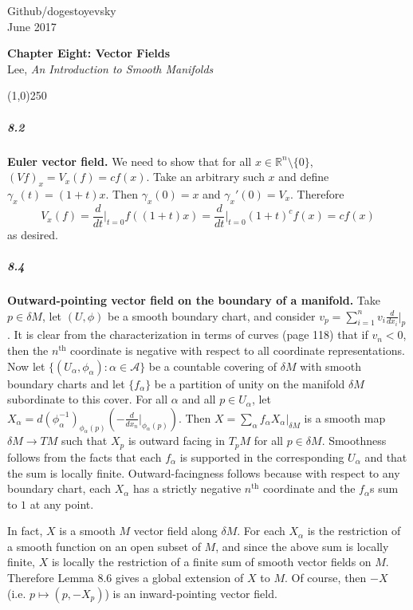 \documentclass[10pt,letter]{article}
\begin{document}
\noindent Github/dogestoyevsky \\
June 2017
\begin{center}
\textbf{Chapter Eight: Vector Fields}\\ Lee, \textit{An Introduction to Smooth Manifolds}

\line(1,0){250}
\end{center}

\subparagraph{8.2} {\bf Euler vector field.}  We need to show that for all $x \in \mathbb{R}^n \setminus \lbrace 0 \rbrace$, $(Vf)_x = V_x(f) = cf(x)$. Take an arbitrary such $x$ and define $\gamma_x(t) = (1+t)x$. Then $\gamma_x(0) = x$ and $\gamma_x'(0) = V_x$. Therefore
\[ V_x(f) = \frac{d}{dt} \bigg\vert_{t = 0} f((1+t)x) = \frac{d}{dt} \bigg\vert_{t = 0} (1+t)^c f(x) = cf(x)
\]
as desired. 

\subparagraph{8.4} {\bf Outward-pointing vector field on the boundary of a manifold.} Take $p \in \delta M$, let $(U,\phi)$ be a smooth boundary chart, and consider $v_p = \sum_{i=1}^n v_i \frac{d}{dx_i}\vert_p$. It is clear from the characterization in terms of curves (page 118) that if $v_n < 0$, then the $n^{\text{th}}$ coordinate is negative with respect to all coordinate representations. Now let $\lbrace (U_{\alpha},\phi_{\alpha}): \alpha \in \mathcal{A} \rbrace$ be a countable covering of $\delta M$ with smooth boundary charts and let $\lbrace f_{\alpha} \rbrace$ be a partition of unity on the manifold $\delta M$ subordinate to this cover. For all $\alpha$ and all $p \in U_{\alpha}$, let $X_{\alpha} =  d(\phi_{\alpha}^{-1})_{\phi_{\alpha}(p)}(-\frac{d}{dx_n}\vert_{\phi_{\alpha}(p)})$. Then $X = \sum_{\alpha} f_{\alpha} X_{\alpha}\vert_{\delta M}$ is a smooth map $\delta M \rightarrow TM$ such that $X_p$ is outward facing in $T_pM$ for all $p \in \delta M$. Smoothness follows from the facts that each $f_{\alpha}$ is supported in the corresponding $U_{\alpha}$ and that the sum is locally finite. Outward-facingness follows because with respect to any boundary chart, each $X_{\alpha}$ has a strictly negative $n^{\text{th}}$ coordinate and the $f_{\alpha}$s sum to $1$ at any point.

In fact, $X$ is a smooth $M$ vector field along $\delta M$. For each $X_{\alpha}$ is the restriction of a smooth function on an open subset of $M$, and since the above sum is locally finite, $X$ is locally the restriction of a finite sum of smooth vector fields on $M$. Therefore Lemma 8.6 gives a global extension of $X$ to $M$. Of course, then $-X$ (i.e. $p \mapsto (p,-X_p)$) is an inward-pointing vector field. 
 
\end{document}
